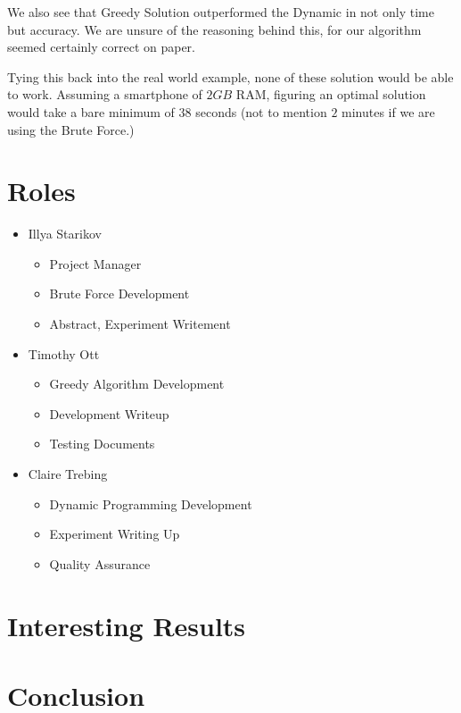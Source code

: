 \documentclass{article}
\begin{document}
We also see that Greedy Solution outperformed the Dynamic in not only time but accuracy. We are unsure of the reasoning behind this, for our algorithm seemed certainly correct on paper.

Tying this back into the real world example, none of these solution would be able to work. Assuming a smartphone of $2GB$ RAM, figuring an optimal solution would take a bare minimum of $38$ seconds (not to mention $2$ minutes if we are using the Brute Force.)

\section{Roles}
\begin{itemize}
    \item Illya Starikov
    \begin{itemize}
        \item Project Manager
        \item Brute Force Development
        \item Abstract, Experiment Writement
    \end{itemize}
    \item Timothy Ott
    \begin{itemize}
        \item Greedy Algorithm Development
        \item Development Writeup
        \item Testing Documents
    \end{itemize}

    \item Claire Trebing
    \begin{itemize}
        \item Dynamic Programming Development
        \item Experiment Writing Up
        \item Quality Assurance
    \end{itemize}
\end{itemize}

\section{Interesting Results}
\section{Conclusion}
\end{document}
